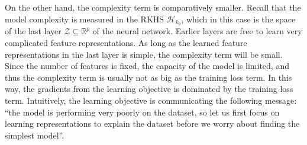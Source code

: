 \documentclass{article}
\begin{document}
		On the other hand, the complexity term is comparatively smaller. Recall that the model complexity is measured in the RKHS $\mathcal{H}_{k_{\theta}}$, which in this case is the space of the last layer $\mathcal{Z} \subseteq \mathbb{R}^{p}$ of the neural network. Earlier layers are free to learn very complicated feature representations. As long as the learned feature representations in the last layer is simple, the complexity term will be small. Since the number of features is fixed, the capacity of the model is limited, and thus the complexity term is usually not as big as the training loss term. In this way, the gradients from the learning objective is dominated by the training loss term. Intuitively, the learning objective is communicating the following message: ``the model is performing very poorly on the dataset, so let us first focus on learning representations to explain the dataset before we worry about finding the simplest model''.
	
\end{document}
